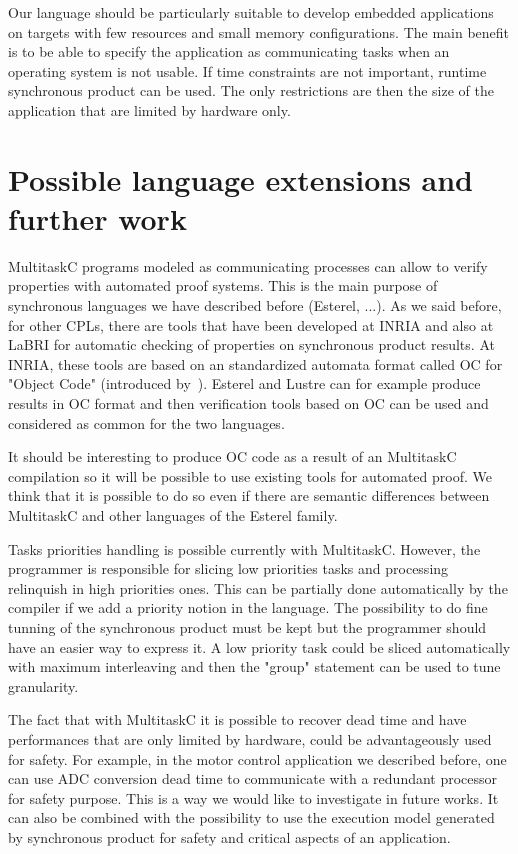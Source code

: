 \documentclass[10pt]{report}
\begin{document}
Our language should be particularly suitable to develop embedded applications on targets with few resources and small
memory configurations. The main benefit is to be able to specify the application as communicating tasks when an operating
system is not usable. If time constraints are not important, runtime synchronous product can be used. The only restrictions
are then the size of the application that are limited by hardware only.

\section{Possible language extensions and further work}

MultitaskC programs modeled as communicating processes can allow to verify properties with automated proof systems. This
is the main purpose of synchronous languages we have described before (Esterel, ...). As we said before, for other CPLs, there
are tools that have been developed at INRIA and also at LaBRI for automatic checking of properties on synchronous
product results. At INRIA, these tools are based on an standardized automata format called OC for "Object Code" (introduced
by~\cite{Halbwachs:91}). Esterel and Lustre can for example produce results in OC format and then verification tools
based on OC can be used and considered as common for the two languages.

It should be interesting to produce OC code as a result of an MultitaskC compilation so it will be possible to use
existing tools for automated proof. We think that it is possible to do so even if there are semantic differences between
MultitaskC and other languages of the Esterel family.

Tasks priorities handling is possible currently with MultitaskC. However, the programmer is responsible for slicing low
priorities tasks and processing relinquish in high priorities ones. This can be partially done automatically by the
compiler if we add a priority notion in the language. The possibility to do fine tunning of the synchronous product must
be kept but the programmer should have an easier way to express it. A low priority task could be sliced automatically with
maximum interleaving and then the "group" statement can be used to tune granularity.

The fact that with MultitaskC it is possible to recover dead time and have performances that are only limited by hardware,
could be advantageously used for safety. For example, in the motor control application we described before, one can use
ADC conversion dead time to communicate with a redundant processor for safety purpose. This is a way we would like to
investigate in future works. It can also be combined with the possibility to use the execution model generated
by synchronous product for safety and critical aspects of an application.


\scriptsize


\end{document}
